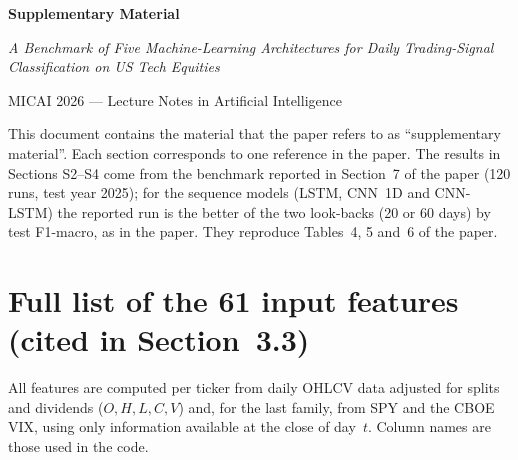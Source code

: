 \documentclass[10pt]{article}
\begin{document}
\begin{center}
{\Large\bfseries Supplementary Material\par}\vspace{4pt}
{\itshape A Benchmark of Five Machine-Learning Architectures for Daily Trading-Signal Classification on US Tech Equities\par}\vspace{3pt}
{\small MICAI 2026 --- Lecture Notes in Artificial Intelligence\par}
\end{center}
\vspace{4pt}

\noindent This document contains the material that the paper refers to as ``supplementary
material''. Each section corresponds to one reference in the paper. The results in Sections S2--S4
come from the benchmark reported in Section~7 of the paper (120 runs, test year 2025); for the sequence models
(LSTM, CNN~1D and CNN-LSTM) the reported run is the better of the two look-backs (20 or 60 days)
by test F1-macro, as in the paper. They reproduce Tables~4, 5 and~6 of the paper.

\section{Full list of the 61 input features (cited in Section~3.3)}
All features are computed per ticker from daily OHLCV data adjusted for splits and dividends
($O,H,L,C,V$) and, for the last family, from SPY and the CBOE VIX, using only information
available at the close of day~$t$. Column names are those used in the code.
\end{document}
